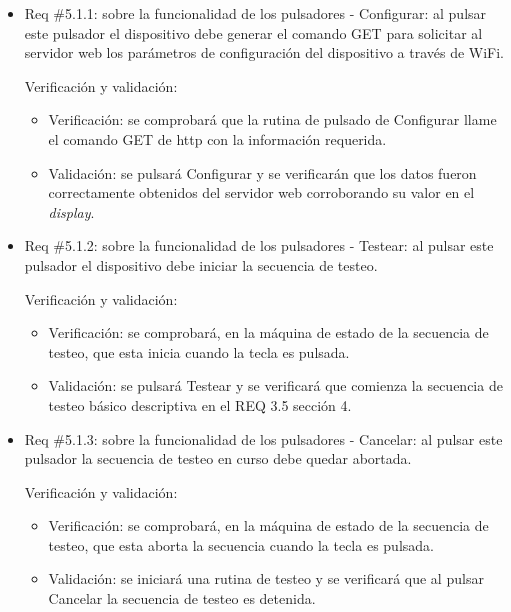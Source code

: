 \documentclass[11pt]{charter}
\begin{document}
\begin{itemize} 
\item Req \#5.1.1: sobre la funcionalidad de los pulsadores - Configurar: al pulsar este pulsador el dispositivo debe generar el comando GET para solicitar al servidor web los parámetros de configuración del dispositivo a través de WiFi.

Verificación y validación:

\begin{itemize}
\item Verificación: se comprobará que la rutina de pulsado de Configurar llame el comando GET de http con la información requerida. 
\item Validación: se pulsará Configurar y se verificarán que los datos fueron correctamente obtenidos del servidor web corroborando su valor en el \textit{display}.
\end{itemize}

\end{itemize}

\begin{itemize} 
\item Req \#5.1.2: sobre la funcionalidad de los pulsadores - Testear: al pulsar este pulsador el dispositivo debe iniciar la secuencia de testeo.

Verificación y validación:

\begin{itemize}
\item Verificación: se comprobará, en la máquina de estado de la secuencia de testeo, que esta inicia cuando la tecla es pulsada.
\item Validación: se pulsará Testear y se verificará que comienza la secuencia de testeo básico descriptiva en el REQ 3.5 sección 4.
\end{itemize}

\end{itemize}

\begin{itemize} 
\item Req \#5.1.3: sobre la funcionalidad de los pulsadores - Cancelar: al pulsar este pulsador la secuencia de testeo en curso debe quedar abortada.

Verificación y validación:

\begin{itemize}
\item Verificación: se comprobará, en la máquina de estado de la secuencia de testeo, que esta aborta la secuencia cuando la tecla es pulsada.
\item Validación: se iniciará una rutina de testeo y se verificará que al pulsar Cancelar la secuencia de testeo es detenida. 
\end{itemize}

\end{itemize}
\end{document}
